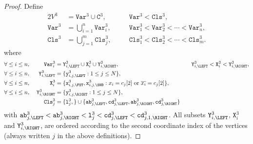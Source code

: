 \begin{proof}
    Define
    \begin{alignat*}{2}
      V^{3} &= \texttt{Var}^{3} \cup \texttt{C}^{3},
      &\quad&\text{$\texttt{Var}^{3} < \texttt{Cls}^{3}$,}
      \\
      \texttt{Var}^{3} &= \bigcup_{i=1}^{n} \texttt{Var}^{3}_{i},
      &&\text{$\texttt{Var}^{3}_1 < \texttt{Var}^{3}_2 < \cdots < \texttt{Var}^{3}_n$,}
      \\
      \texttt{Cls}^{3} &= \bigcup_{j=1}^{m} \texttt{Cls}^{3}_{j},
      &&\text{$\texttt{Cls}^{3}_1 < \texttt{Cls}^{3}_2 < \cdots < \texttt{Cls}^{3}_m$.}
    \end{alignat*}
    where
    \begin{alignat*}{3}
      &\forall \leq i \leq n,\;&
      \texttt{Var}^{3}_{i} &= \texttt{Y}^{3}_{i,\LEFT} \cup \texttt{X}^{3}_{i} \cup \texttt{Y}^{3}_{i,\RIGHT},
      &\quad&\text{$\texttt{Y}^{3}_{i,\LEFT} < \texttt{X}^{3}_{i} < \texttt{Y}^{3}_{i,\RIGHT}$},
      \\
      &\forall \leq i \leq n,\;&
      \texttt{Y}^{3}_{i,\LEFT}
      &=
      \{\texttt{y}^{3}_{i,j,\LEFT} : 1 \leq j \leq N\},
      &&
      \\
      &\forall \leq i \leq n,\;&
      \texttt{X}^{3}_{i}
      &=
      \{\texttt{x}^{3}_{i,j,\FST}, \texttt{x}^{3}_{i,j,\SND} :
      \text{$x_{i} = c_{j}[2]$ or $\overline{x_{i}} = c_{j}[2]$}\},
      &&
      \\
      &\forall \leq i \leq n,\;&
      \texttt{Y}^{3}_{i,\RIGHT}
      &=
      \{\texttt{y}^{3}_{i,j,\RIGHT} : 1 \leq j \leq N\},
      &&
      \\
      &&\texttt{Cls}^{3}_{j}
      &=
      \{
      \texttt{l}^{3}_{j},
      \}
      \cup
      \{
      \texttt{ab}^{3}_{j,\LEFT},
      \texttt{cd}^{3}_{j,\LEFT},
      \texttt{ab}^{3}_{j,\RIGHT},
      \texttt{cd}^{3}_{j,\RIGHT}
      \}
      &&
    \end{alignat*}
    with
    $
    \texttt{ab}^{3}_{j,\LEFT} <
    \texttt{ab}^{3}_{j,\RIGHT} <
    \texttt{l}^{3}_{j} <
    \texttt{cd}^{3}_{j,\LEFT} <
    \texttt{cd}^{3}_{j,1,\RIGHT}
    $.
    All subsets
    $\texttt{Y}^{3}_{i,\LEFT}$, $\texttt{X}^{3}_{i}$ and $\texttt{Y}^{3}_{i,\RIGHT}$,
    are ordered according to the second coordinate index of the vertices
    (always written $j$ in the above definitions).


\end{proof}
